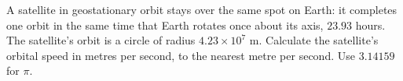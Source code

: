 A satellite in geostationary orbit stays over the same spot on Earth: it completes one orbit in the same time that Earth rotates once about its axis, $23.93$ hours. The satellite's orbit is a circle of radius $4.23\times10^7$ m. Calculate the satellite's orbital speed in metres per second, to the nearest metre per second. Use $3.14159$ for $\pi$.
